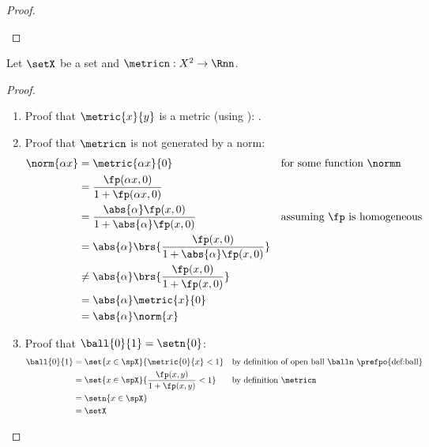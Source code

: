 {\begin{proof}
\begin{enumerate}
\end{enumerate}
\end{proof}



\begin{example}
\label{ex:d_bounded}
Let $\setX$ be a set and $\metricn:X^2\to\Rnn$.
\end{example}
\begin{proof}
\begin{enumerate}
  \item Proof that $\metric{x}{y}$ is a metric (using ):
        .

  \item Proof that $\metricn$ is not generated by a norm:
    \begin{align*}
      \norm{\alpha x}
        &= \metric{\alpha x}{0}
        && \text{for some function $\normn$}
      \\&= \frac{\fp(\alpha x, 0)}{1 + \fp(\alpha x,0)}
      \\&= \frac{\abs{\alpha}\fp( x, 0)}{1 + \abs{\alpha}\fp(x,0)}
        && \text{assuming $\fp$ is homogeneous}
      \\&= \abs{\alpha}\brs{\frac{\fp( x, 0)}{1 + \abs{\alpha}\fp(x,0)}}
      \\&\ne  \abs{\alpha}\brs{\frac{\fp( x, 0)}{1 + \fp(x,0)}}
      \\&= \abs{\alpha} \metric{x}{0}
      \\&= \abs{\alpha} \norm{x}
    \end{align*}

  \item Proof that $\ball{0}{1}=\setn{0}$:
    \begin{align*}
      \ball{0}{1}
        &= \set{x\in\spX}{\metric{0}{x}<1}
        && \text{by definition of open ball $\balln$ \prefpo{def:ball}}
      \\&= \set{x\in\spX}{\frac{\fp(x,y)}{1+\fp(x,y)}<1}
        && \text{by definition $\metricn$}
      \\&= \setn{x\in\spX}
      \\&= \setX
    \end{align*}


\end{enumerate}
\end{proof}}
